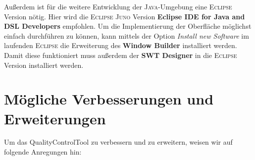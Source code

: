 \documentclass[onecolumn,german]{article}
\begin{document}
Außerdem ist für die weitere Entwicklung der \textsc{Java}-Umgebung eine \textsc{Eclipse} Version nötig. Hier wird die \textsc{Eclipse Juno} Version \textbf{Eclipse IDE for Java and DSL Developers\footnotemark} empfohlen. Um die Implementierung der Oberfläche möglichst einfach durchführen zu können, kann mittels der Option \textit{Install new Software} im laufenden \textsc{Eclipse} die Erweiterung des \textbf{Window Builder\footnotemark[8]} installiert werden. Damit diese funktioniert muss außerdem der \textbf{SWT Designer\footnotemark} in die \textsc{Eclipse} Version installiert werden.

\newpage

\section{Mögliche Verbesserungen und Erweiterungen}

Um das QualityControlTool zu verbessern und zu erweitern, weisen wir auf folgende Anregungen hin:
\end{document}
